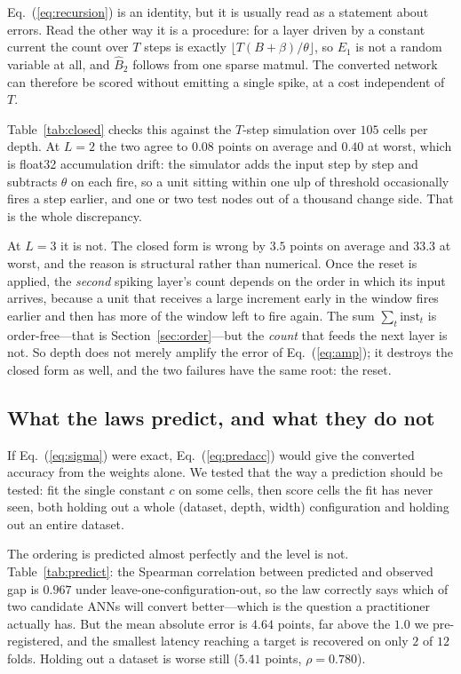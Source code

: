 \documentclass[10pt,twocolumn]{article}
\newcommand{\tabref}[1]{Table~\ref{#1}}
\newcommand{\secref}[1]{Section~\ref{#1}}
\newcommand{\eqnref}[1]{Eq.~(\ref{#1})}
\begin{document}
\eqnref{eq:recursion} is an identity, but it is usually read as a statement about errors. Read the
other way it is a procedure: for a layer driven by a constant current the count over $T$ steps is
exactly $\lfloor T(B+\beta)/\theta\rfloor$, so $E_{1}$ is not a random variable at all, and
$\hat{B}_{2}$ follows from one sparse matmul. The converted network can therefore be scored without
emitting a single spike, at a cost independent of $T$.

\tabref{tab:closed} checks this against the $T$-step simulation over $105$ cells per depth. At
$L=2$ the two agree to $0.08$ points on average and $0.40$ at worst, which is float32 accumulation
drift: the simulator adds the input step by step and subtracts $\theta$ on each fire, so a unit
sitting within one ulp of threshold occasionally fires a step earlier, and one or two test nodes out
of a thousand change side. That is the whole discrepancy.

At $L=3$ it is not. The closed form is wrong by $3.5$ points on average and $33.3$ at worst, and the
reason is structural rather than numerical. Once the reset is applied, the \emph{second} spiking
layer's count depends on the order in which its input arrives, because a unit that receives a large
increment early in the window fires earlier and then has more of the window left to fire again. The
sum $\sum_t \mathrm{inst}_t$ is order-free---that is \secref{sec:order}---but the \emph{count} that
feeds the next layer is not. So depth does not merely amplify the error of \eqnref{eq:amp}; it
destroys the closed form as well, and the two failures have the same root: the reset.


\subsection{What the laws predict, and what they do not}
\label{sec:ranking}

If \eqnref{eq:sigma} were exact, \eqnref{eq:predacc} would give the converted accuracy from the
weights alone. We tested that the way a prediction should be tested: fit the single constant $c$ on
some cells, then score cells the fit has never seen, both holding out a whole (dataset, depth, width)
configuration and holding out an entire dataset.

The ordering is predicted almost perfectly and the level is not. \tabref{tab:predict}: the Spearman
correlation between predicted and observed gap is $0.967$ under leave-one-configuration-out, so the
law correctly says which of two candidate ANNs will convert better---which is the question a
practitioner actually has. But the mean absolute error is $4.64$ points, far above the $1.0$ we
pre-registered, and the smallest latency reaching a target is recovered on only $2$ of $12$ folds.
Holding out a dataset is worse still ($5.41$ points, $\rho=0.780$).
\end{document}
